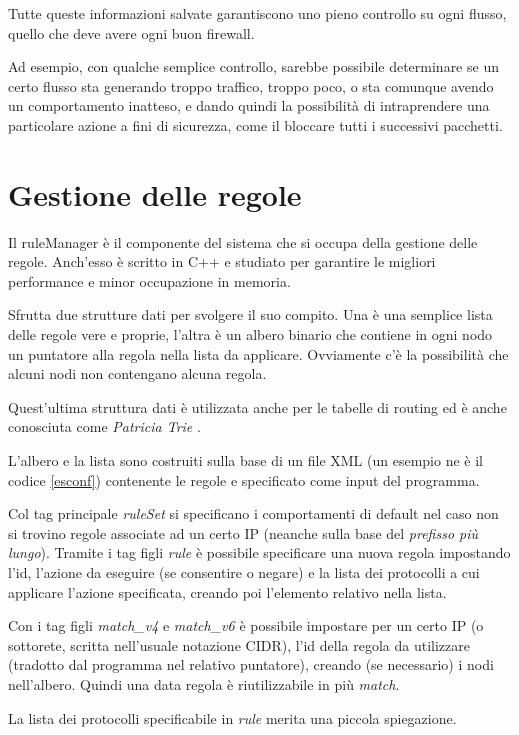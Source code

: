 Tutte queste informazioni salvate garantiscono uno pieno controllo su ogni flusso, quello che deve avere ogni buon firewall.

Ad esempio, con qualche semplice controllo, sarebbe possibile determinare se un certo flusso sta generando troppo traffico, troppo poco, o sta comunque avendo un comportamento inatteso, e dando quindi la possibilità di intraprendere una particolare azione a fini di sicurezza, come il bloccare tutti i successivi pacchetti.

\section{Gestione delle regole}

Il ruleManager è il componente del sistema che si occupa della gestione delle regole. Anch'esso è scritto in C++ e studiato per garantire le migliori performance e minor occupazione in memoria.

Sfrutta due strutture dati per svolgere il suo compito. Una è una semplice lista delle regole vere e proprie, l'altra è un albero binario che contiene in ogni nodo un puntatore alla regola nella lista da applicare. Ovviamente c'è la possibilità che alcuni nodi non contengano alcuna regola.

Quest'ultima struttura dati è utilizzata anche per le tabelle di routing ed è anche conosciuta come \emph{Patricia Trie} \cite{trie}.

L'albero e la lista sono costruiti sulla base di un file XML (un esempio ne è il codice \ref{esconf}) contenente le regole e specificato come input del programma.

Col tag principale \emph{ruleSet} si specificano i comportamenti di default nel caso non si trovino regole associate ad un certo IP (neanche sulla base del \emph{prefisso più lungo}). Tramite i tag figli \emph{rule} è possibile specificare una nuova regola impostando l'id, l'azione da eseguire (se consentire o negare) e la lista dei protocolli a cui applicare l'azione specificata, creando poi l'elemento relativo nella lista.

Con i tag figli \emph{match\_v4} e \emph{match\_v6} è possibile impostare per un certo IP (o sottorete, scritta nell'usuale notazione CIDR), l'id della regola da utilizzare (tradotto dal programma nel relativo puntatore), creando (se necessario) i nodi nell'albero. Quindi una data regola è riutilizzabile in più \emph{match}.

La lista dei protocolli specificabile in \emph{rule} merita una piccola spiegazione.

